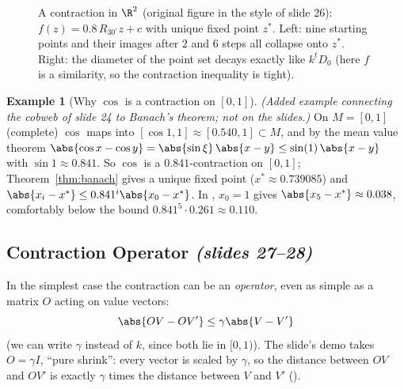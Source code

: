 \documentclass[11pt,a4paper]{article}
\newcommand{\slides}[1]{\emph{(slides #1)}}
\theoremstyle{plain}
\theoremstyle{definition}
\newtheorem{example}[theorem]{Example}
\theoremstyle{remark}
\begin{document}
\begin{figure}[htbp]
\begin{minipage}{0.45\linewidth}
\end{minipage}
\caption{A contraction in $\R^2$ (original figure in the style of slide 26): $f(z)=0.8\,R_{30^\circ}z+c$ with unique fixed point $z^*$. Left: nine starting points and their images after $2$ and $6$ steps all collapse onto $z^*$. Right: the diameter of the point set decays exactly like $k^tD_0$ (here $f$ is a similarity, so the contraction inequality is tight).}
\label{fig:contraction}
\end{figure}

\begin{example}[{Why $\cos$ is a contraction on $[0,1]$}]\label{ex:cos}
\emph{(Added example connecting the cobweb of slide 24 to Banach's theorem; not on the slides.)} On $M=[0,1]$ (complete) $\cos$ maps into $[\cos1,1]\approx[0.540,1]\subset M$, and by the mean value theorem $\abs{\cos x-\cos y}=\abs{\sin\xi}\,\abs{x-y}\le\sin(1)\,\abs{x-y}$ with $\sin 1\approx0.841$. So $\cos$ is a $0.841$-contraction on $[0,1]$; Theorem~\ref{thm:banach} gives a unique fixed point ($x^*\approx0.739085$) and $\abs{x_i-x^*}\le0.841^i\abs{x_0-x^*}$. In , $x_0=1$ gives $\abs{x_5-x^*}\approx0.038$, comfortably below the bound $0.841^5\cdot0.261\approx0.110$.
\end{example}

\subsection{Contraction Operator \slides{27--28}}
In the simplest case the contraction can be an \emph{operator}, even as simple as a matrix $O$ acting on value vectors:
\[
\abs{OV-OV'}\le\gamma\abs{V-V'}
\]
(we can write $\gamma$ instead of $k$, since both lie in $[0,1)$). The slide's demo takes $O=\gamma I$, ``pure shrink'': every vector is scaled by $\gamma$, so the distance between $OV$ and $OV'$ is exactly $\gamma$ times the distance between $V$ and $V'$ ().
\end{document}
